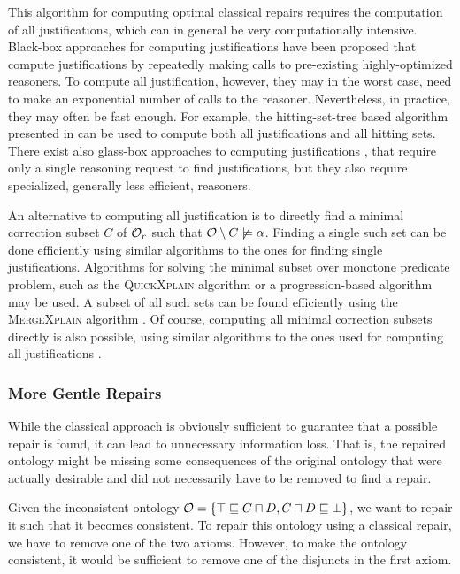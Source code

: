 This algorithm for computing optimal classical repairs requires the computation of all justifications, which can in general be very computationally intensive. Black-box approaches for computing justifications have been proposed \cite{kalyanpur2007finding,schlobach2003non,schlobach2007debugging} that compute justifications by repeatedly making calls to pre-existing highly-optimized reasoners. To compute all justification, however, they may in the worst case, need to make an exponential number of calls to the reasoner. Nevertheless, in practice, they may often be fast enough. For example, the hitting-set-tree based algorithm presented in \cite{kalyanpur2007finding} can be used to compute both all justifications and all hitting sets. There exist also glass-box approaches to computing justifications \cite{kalyanpur2007finding}, that require only a single reasoning request to find justifications, but they also require specialized, generally less efficient, reasoners.

An alternative to computing all justification is to directly find a minimal correction subset $C$ of $\mathcal{O}_r$ such that $\mathcal{O} \setminus C \not\models \alpha$. Finding a single such set can be done efficiently using similar algorithms to the ones for finding single justifications. Algorithms for solving the minimal subset over monotone predicate problem, such as the \textsc{QuickXplain} algorithm \cite{junker2004preferred} or a progression-based algorithm \cite{marques2013minimal} may be used. A subset of all such sets can be found efficiently using the \textsc{MergeXplain} algorithm \cite{shchekotykhin2015mergexplain}. Of course, computing all minimal correction subsets directly is also possible, using similar algorithms to the ones used for computing all justifications \cite{malouf2007maximal}.

\subsubsection{More Gentle Repairs} \label{more-gentle-repairs}

While the classical approach is obviously sufficient to guarantee that a possible repair is found, it can lead to unnecessary information loss. That is, the repaired ontology might be missing some consequences of the original ontology that were actually desirable and did not necessarily have to be removed to find a repair.

\begin{example}
  Given the inconsistent ontology $\mathcal{O} = \{ \top \sqsubseteq C \sqcap D, C \sqcap D \sqsubseteq \bot \}$, we want to repair it such that it becomes consistent. To repair this ontology using a classical repair, we have to remove one of the two axioms. However, to make the ontology consistent, it would be sufficient to remove one of the disjuncts in the first axiom.
\end{example}

